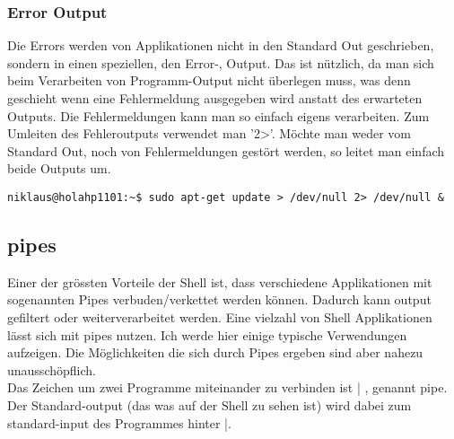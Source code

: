 \subsubsection{Error Output}
Die Errors werden von Applikationen nicht in den Standard Out geschrieben, sondern in einen speziellen, den Error-, Output. Das ist n\"utzlich, da man sich beim Verarbeiten von Programm-Output nicht \"uberlegen muss, was denn geschieht wenn eine Fehlermeldung ausgegeben wird anstatt des erwarteten Outputs. Die Fehlermeldungen kann man so einfach eigens verarbeiten. Zum Umleiten des Fehleroutputs verwendet man '2\textgreater'. M\"ochte man weder vom Standard Out, noch von Fehlermeldungen gest\"ort werden, so leitet man einfach beide Outputs um.
\begin{lstlisting}[frame=single, style=shell]
niklaus@holahp1101:~$ sudo apt-get update > /dev/null 2> /dev/null &
\end{lstlisting}
\subsection{pipes}
Einer der gr\"ossten Vorteile der Shell ist, dass verschiedene Applikationen mit sogenannten Pipes verbuden/verkettet werden k\"onnen. Dadurch kann output gefiltert oder weiterverarbeitet werden. Eine vielzahl von Shell Applikationen l\"asst sich mit pipes nutzen. Ich werde hier einige typische Verwendungen aufzeigen. Die M\"oglichkeiten die sich durch Pipes ergeben sind aber nahezu unaussch\"opflich.\\
Das Zeichen um zwei Programme miteinander zu verbinden ist | , genannt pipe. Der Standard-output (das was auf der Shell zu sehen ist) wird dabei zum standard-input des Programmes hinter |.
